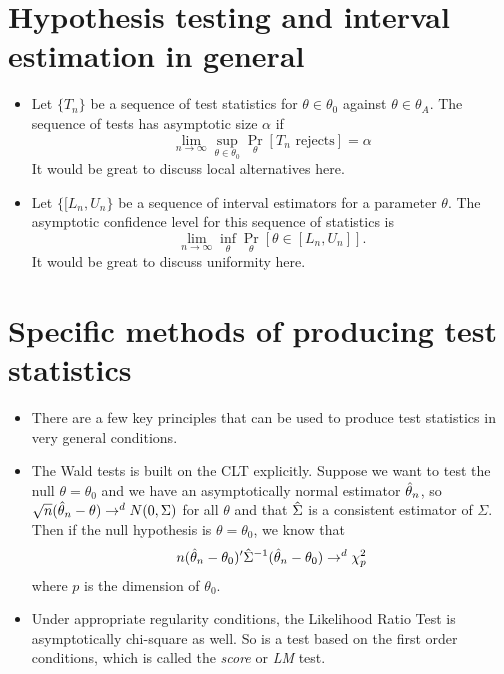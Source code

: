 \section{Hypothesis testing and interval estimation in general}

\begin{itemize}

\item Let $\{T_n\}$ be a sequence of test statistics for $\theta \in \theta_0$
  against $\theta \in \theta_A$.  The sequence of tests has asymptotic size $\alpha$ if
  \begin{equation*}
    \lim_{n \to \infty} \sup_{\theta \in \theta_0} \Pr_\theta[T_n \text{ rejects}] = \alpha
  \end{equation*}
  It would be great to discuss local alternatives here.

\item Let $\{[L_n, U_n\}$ be a sequence of interval estimators for a
  parameter $\theta$.  The asymptotic confidence level for this sequence of
  statistics is
  \begin{equation*}
    \lim_{n \to \infty} \inf_\theta \Pr_{\theta}[\theta \in [L_n, U_n]].
  \end{equation*}
  It would be great to discuss uniformity here.

\end{itemize}

\section{Specific methods of producing test statistics}

\begin{itemize}

\item There are a few key principles that can be used to produce test
  statistics in very general conditions.

\item The Wald tests is built on the CLT explicitly.  Suppose we want
  to test the null $\theta = \theta_0$ and we have an asymptotically normal
  estimator $\hat{\theta}_n$, so $\sqrt{n} (\hat{\theta}_n - \theta) \to^d N(0,\Sigma)$ for all $\theta$
  and that $\hat{\Sigma}$ is a consistent estimator of $\Sigma$.  Then if the null
  hypothesis is $\theta = \theta_0$, we know that
  \begin{equation*}
    n (\hat{\theta}_n - \theta_0)' \hat{\Sigma}^{-1} (\hat{\theta}_n - \theta_0) \to^d \chi^2_p
  \end{equation*}
  where $p$ is the dimension of $\theta_0$.

\item Under appropriate regularity conditions, the Likelihood Ratio
  Test is asymptotically chi-square as well.  So is a test based on
  the first order conditions, which is called the \emph{score} or
  \emph{LM} test.

\end{itemize}

